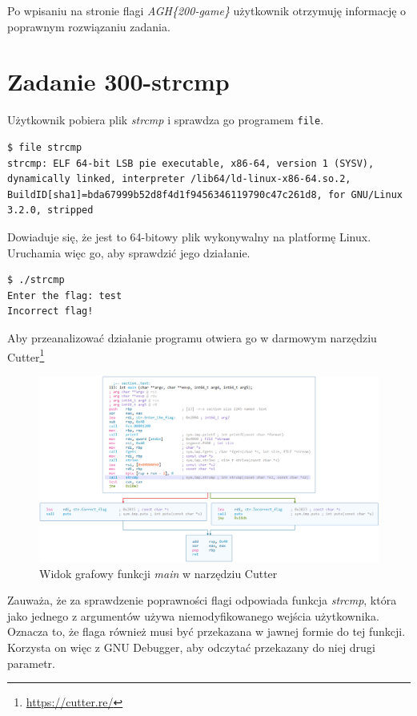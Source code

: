 \documentclass[language=polish,type=eng]{aghmodern}
\begin{document}
\begin{appendices}
Po wpisaniu na stronie flagi \emph{AGH\{200-game\}} użytkownik otrzymuję informację
o poprawnym rozwiązaniu zadania.

\section{Zadanie 300-strcmp}

Użytkownik pobiera plik \emph{strcmp} i sprawdza go programem \texttt{file}.

\begin{verbatim}
$ file strcmp
strcmp: ELF 64-bit LSB pie executable, x86-64, version 1 (SYSV), dynamically linked, interpreter /lib64/ld-linux-x86-64.so.2, BuildID[sha1]=bda67999b52d8f4d1f9456346119790c47c261d8, for GNU/Linux 3.2.0, stripped
\end{verbatim}

Dowiaduje się, że jest to 64-bitowy plik wykonywalny na platformę Linux.
Uruchamia więc go, aby sprawdzić jego działanie.

\begin{verbatim}
$ ./strcmp
Enter the flag: test
Incorrect flag!
\end{verbatim}

Aby przeanalizować działanie programu otwiera go w darmowym narzędziu Cutter\footnote{\url{https://cutter.re/}}

\begin{figure}[H]
\centering
\includegraphics[width=\textwidth]{300_cutter}
\caption{Widok grafowy funkcji \emph{main} w narzędziu Cutter}
\end{figure}

Zauważa, że za sprawdzenie poprawności flagi odpowiada funkcja \emph{strcmp}, która
jako jednego z argumentów używa niemodyfikowanego wejścia użytkownika.
Oznacza to, że flaga również musi być przekazana w jawnej formie do tej funkcji.
Korzysta on więc z GNU Debugger, aby odczytać przekazany do niej drugi parametr.


\end{appendices}
\end{document}
